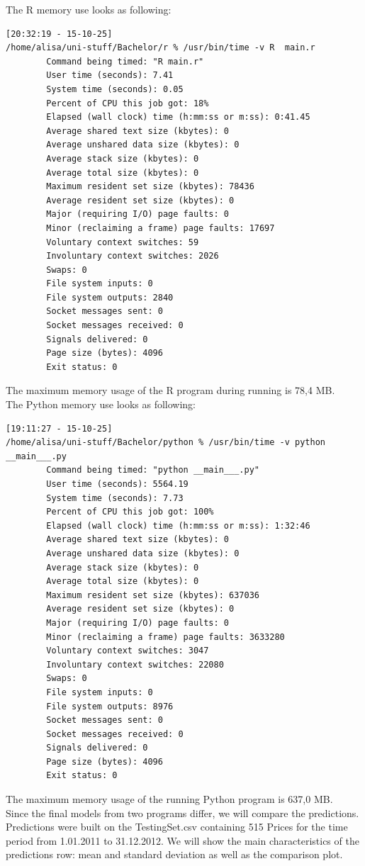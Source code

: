 \documentclass{article}
\begin{document}
The R memory use looks as following:
\begin{verbatim}
[20:32:19 - 15-10-25] 
/home/alisa/uni-stuff/Bachelor/r % /usr/bin/time -v R  main.r
        Command being timed: "R main.r"
        User time (seconds): 7.41
        System time (seconds): 0.05
        Percent of CPU this job got: 18%
        Elapsed (wall clock) time (h:mm:ss or m:ss): 0:41.45
        Average shared text size (kbytes): 0
        Average unshared data size (kbytes): 0
        Average stack size (kbytes): 0
        Average total size (kbytes): 0
        Maximum resident set size (kbytes): 78436
        Average resident set size (kbytes): 0
        Major (requiring I/O) page faults: 0
        Minor (reclaiming a frame) page faults: 17697
        Voluntary context switches: 59
        Involuntary context switches: 2026
        Swaps: 0
        File system inputs: 0
        File system outputs: 2840
        Socket messages sent: 0
        Socket messages received: 0
        Signals delivered: 0
        Page size (bytes): 4096
        Exit status: 0
\end{verbatim}
The maximum memory usage of the R program during running is 78,4 MB.\\
The Python memory use looks as following:
\begin{verbatim}
[19:11:27 - 15-10-25] 
/home/alisa/uni-stuff/Bachelor/python % /usr/bin/time -v python __main___.py
        Command being timed: "python __main___.py"
        User time (seconds): 5564.19
        System time (seconds): 7.73
        Percent of CPU this job got: 100%
        Elapsed (wall clock) time (h:mm:ss or m:ss): 1:32:46
        Average shared text size (kbytes): 0
        Average unshared data size (kbytes): 0
        Average stack size (kbytes): 0
        Average total size (kbytes): 0
        Maximum resident set size (kbytes): 637036
        Average resident set size (kbytes): 0
        Major (requiring I/O) page faults: 0
        Minor (reclaiming a frame) page faults: 3633280
        Voluntary context switches: 3047
        Involuntary context switches: 22080
        Swaps: 0
        File system inputs: 0
        File system outputs: 8976
        Socket messages sent: 0
        Socket messages received: 0
        Signals delivered: 0
        Page size (bytes): 4096
        Exit status: 0
\end{verbatim}
The maximum memory usage of the running Python program is 637,0 MB.\\
Since the final models from two programs differ, we will compare the predictions. Predictions were built on the TestingSet.csv containing 515 Prices for the time period from 1.01.2011 to 31.12.2012. We will show the main characteristics of the predictions row: mean and standard deviation as well as the comparison plot.\\
\end{document}

